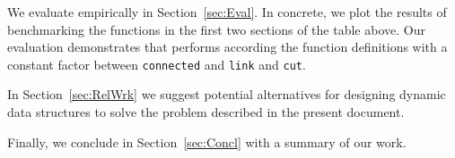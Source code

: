 We evaluate \dyntset empirically in Section~\ref{sec:Eval}. In concrete, we plot the results of benchmarking the functions in the first two sections of the table above. Our evaluation demonstrates that \dyntset performs according the function definitions with a constant factor between \texttt{connected} and \texttt{link} and \texttt{cut}. 

In Section~\ref{sec:RelWrk} we suggest potential alternatives for designing dynamic data structures to solve the problem described in the present document. 

Finally, we conclude in Section~\ref{sec:Concl} with a summary of our work.



